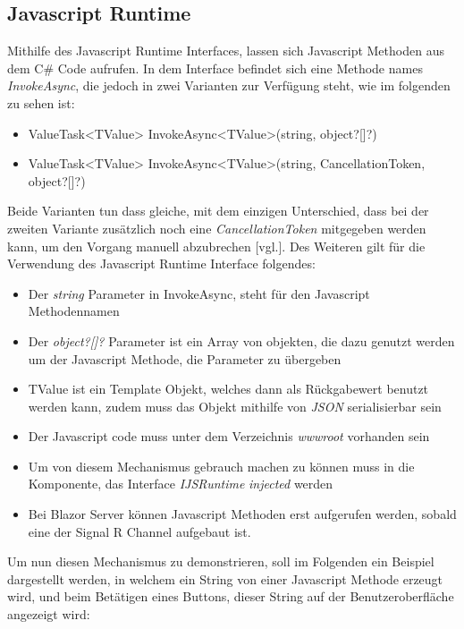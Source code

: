 \subsection{Javascript Runtime}
\label{subsec:jsruntime}
Mithilfe des Javascript Runtime Interfaces, lassen sich Javascript Methoden aus dem C\# Code
aufrufen. In dem Interface befindet sich eine Methode names \emph{InvokeAsync}, die jedoch in zwei
Varianten zur Verfügung steht, wie im folgenden zu sehen ist:
\begin{itemize}
    \item ValueTask<TValue> InvokeAsync<TValue>(string, object?[]?)
    \item ValueTask<TValue> InvokeAsync<TValue>(string, CancellationToken, object?[]?)
\end{itemize}
Beide Varianten tun dass gleiche, mit dem einzigen Unterschied, dass bei der zweiten Variante
zusätzlich noch eine \emph{CancellationToken} mitgegeben werden kann, um den Vorgang manuell
abzubrechen \cite{JsRuntime}[vgl.].
\newline
\newline
Des Weiteren gilt für die Verwendung des Javascript Runtime Interface folgendes:
\begin{itemize}
    \item Der \emph{string} Parameter in InvokeAsync, steht für den Javascript Methodennamen
    \item Der \emph{object?[]?} Parameter ist ein Array von objekten, die dazu genutzt werden um
    der Javascript Methode, die Parameter zu übergeben
    \item TValue ist ein Template Objekt, welches dann als Rückgabewert benutzt werden kann,
    zudem muss das Objekt mithilfe von \emph{JSON} serialisierbar sein
    \item Der Javascript code muss unter dem Verzeichnis \emph{wwwroot} vorhanden sein
    \item Um von diesem Mechanismus gebrauch machen zu können muss in die Komponente, das
    Interface \emph{IJSRuntime} \emph{injected} werden
    \item Bei Blazor Server können Javascript Methoden erst aufgerufen werden, sobald eine der
    Signal R Channel aufgebaut ist.
\end{itemize}

Um nun diesen Mechanismus zu demonstrieren, soll im Folgenden ein Beispiel dargestellt werden, in
welchem ein String von einer Javascript Methode erzeugt wird, und beim Betätigen eines Buttons,
dieser String auf der Benutzeroberfläche angezeigt wird:

